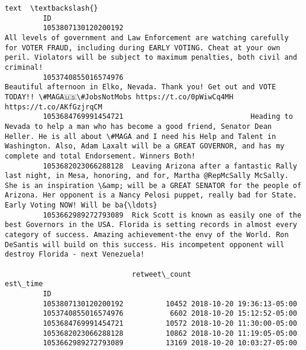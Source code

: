 \documentclass[11pt]{article}
\begin{document}
\begin{Verbatim}[commandchars=\\\{\}]
                                                                                                                                                                                                                                                                                                                 text  \textbackslash{}
         ID                                                                                                                                                                                                                                                                                                             
         1053807130120200192                                                                    All levels of government and Law Enforcement are watching carefully for VOTER FRAUD, including during EARLY VOTING. Cheat at your own peril. Violators will be subject to maximum penalties, both civil and criminal!   
         1053740855016574976                                                                                                                                             Beautiful afternoon in Elko, Nevada. Thank you! Get out and VOTE TODAY!! \#MAGA🇺🇸\#JobsNotMobs https://t.co/0pWiwCq4MH https://t.co/AKfGzjrqCM   
         1053684769991454721                              Heading to Nevada to help a man who has become a good friend, Senator Dean Heller. He is all about \#MAGA and I need his Help and Talent in Washington. Also, Adam Laxalt will be a GREAT GOVERNOR, and has my complete and total Endorsement. Winners Both!   
         1053682023066288128  Leaving Arizona after a fantastic Rally last night, in Mesa, honoring, and for, Martha @RepMcSally McSally. She is an inspiration \&amp; will be a GREAT SENATOR for the people of Arizona. Her opponent is a Nancy Pelosi puppet, really bad for State. Early Voting NOW! Will be ba{\ldots}   
         1053662989272793089  Rick Scott is known as easily one of the best Governors in the USA. Florida is setting records in almost every category of success. Amazing achievement-the envy of the World. Ron DeSantis will build on this success. His incompetent opponent will destroy Florida - next Venezuela!   
         
                              retweet\_count                  est\_time  
         ID                                                            
         1053807130120200192          10452 2018-10-20 19:36:13-05:00  
         1053740855016574976           6602 2018-10-20 15:12:52-05:00  
         1053684769991454721          10572 2018-10-20 11:30:00-05:00  
         1053682023066288128          10862 2018-10-20 11:19:05-05:00  
         1053662989272793089          13169 2018-10-20 10:03:27-05:00  
\end{Verbatim}
            
\end{document}
